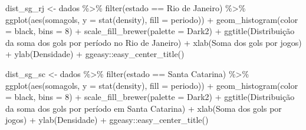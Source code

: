 \documentclass[
]{article}
\newenvironment{Shaded}{\begin{snugshade}}{\end{snugshade}}
\newcommand{\AttributeTok}[1]{\textcolor[rgb]{0.77,0.63,0.00}{#1}}
\newcommand{\DecValTok}[1]{\textcolor[rgb]{0.00,0.00,0.81}{#1}}
\newcommand{\FunctionTok}[1]{\textcolor[rgb]{0.00,0.00,0.00}{#1}}
\newcommand{\NormalTok}[1]{#1}
\newcommand{\OtherTok}[1]{\textcolor[rgb]{0.56,0.35,0.01}{#1}}
\newcommand{\SpecialCharTok}[1]{\textcolor[rgb]{0.00,0.00,0.00}{#1}}
\newcommand{\StringTok}[1]{\textcolor[rgb]{0.31,0.60,0.02}{#1}}
\begin{document}
\begin{Shaded}
\begin{Highlighting}[]
\NormalTok{dist\_sg\_rj }\OtherTok{\textless{}{-}}\NormalTok{ dados }\SpecialCharTok{\%\textgreater{}\%} \FunctionTok{filter}\NormalTok{(estado }\SpecialCharTok{==} \StringTok{\textquotesingle{}Rio de Janeiro\textquotesingle{}}\NormalTok{) }\SpecialCharTok{\%\textgreater{}\%}
  \FunctionTok{ggplot}\NormalTok{(}\FunctionTok{aes}\NormalTok{(somagols, }\AttributeTok{y =} \FunctionTok{stat}\NormalTok{(density), }\AttributeTok{fill =}\NormalTok{ periodo)) }\SpecialCharTok{+} 
  \FunctionTok{geom\_histogram}\NormalTok{(}\AttributeTok{color =} \StringTok{\textquotesingle{}black\textquotesingle{}}\NormalTok{, }\AttributeTok{bins =} \DecValTok{8}\NormalTok{) }\SpecialCharTok{+} 
  \FunctionTok{scale\_fill\_brewer}\NormalTok{(}\AttributeTok{palette =} \StringTok{\textquotesingle{}Dark2\textquotesingle{}}\NormalTok{) }\SpecialCharTok{+}
  \FunctionTok{ggtitle}\NormalTok{(}\StringTok{\textquotesingle{}Distribuição da soma dos gols por período no Rio de Janeiro\textquotesingle{}}\NormalTok{) }\SpecialCharTok{+}
  \FunctionTok{xlab}\NormalTok{(}\StringTok{\textquotesingle{}Soma dos gols por jogos\textquotesingle{}}\NormalTok{) }\SpecialCharTok{+} \FunctionTok{ylab}\NormalTok{(}\StringTok{\textquotesingle{}Densidade\textquotesingle{}}\NormalTok{) }\SpecialCharTok{+}
\NormalTok{  ggeasy}\SpecialCharTok{::}\FunctionTok{easy\_center\_title}\NormalTok{()}

\NormalTok{dist\_sg\_sc }\OtherTok{\textless{}{-}}\NormalTok{ dados }\SpecialCharTok{\%\textgreater{}\%} \FunctionTok{filter}\NormalTok{(estado }\SpecialCharTok{==} \StringTok{\textquotesingle{}Santa Catarina\textquotesingle{}}\NormalTok{) }\SpecialCharTok{\%\textgreater{}\%}
  \FunctionTok{ggplot}\NormalTok{(}\FunctionTok{aes}\NormalTok{(somagols, }\AttributeTok{y =} \FunctionTok{stat}\NormalTok{(density), }\AttributeTok{fill =}\NormalTok{ periodo)) }\SpecialCharTok{+} 
  \FunctionTok{geom\_histogram}\NormalTok{(}\AttributeTok{color =} \StringTok{\textquotesingle{}black\textquotesingle{}}\NormalTok{, }\AttributeTok{bins =} \DecValTok{8}\NormalTok{) }\SpecialCharTok{+} 
  \FunctionTok{scale\_fill\_brewer}\NormalTok{(}\AttributeTok{palette =} \StringTok{\textquotesingle{}Dark2\textquotesingle{}}\NormalTok{) }\SpecialCharTok{+}
  \FunctionTok{ggtitle}\NormalTok{(}\StringTok{\textquotesingle{}Distribuição da soma dos gols por período em Santa Catarina\textquotesingle{}}\NormalTok{) }\SpecialCharTok{+}
  \FunctionTok{xlab}\NormalTok{(}\StringTok{\textquotesingle{}Soma dos gols por jogos\textquotesingle{}}\NormalTok{) }\SpecialCharTok{+} \FunctionTok{ylab}\NormalTok{(}\StringTok{\textquotesingle{}Densidade\textquotesingle{}}\NormalTok{) }\SpecialCharTok{+}
\NormalTok{  ggeasy}\SpecialCharTok{::}\FunctionTok{easy\_center\_title}\NormalTok{()}


\end{Highlighting}
\end{Shaded}
\end{document}
